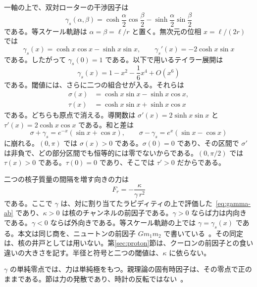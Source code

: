 \documentclass[a4paper]{article}
\begin{document}
一軸の上で、双対ローターの干渉因子は
\begin{equation}
\label{eq:gamma-ab}
\gamma_s(\alpha,\beta)
  =\cosh\frac{\alpha}{2}\cos\frac{\beta}{2}
  -\sinh\frac{\alpha}{2}\sin\frac{\beta}{2}
\end{equation}
である。等スケール軌跡は \(\alpha=\beta=\ell/r\) と置く。無次元の位相 \(x=\ell/(2r)\) では
\begin{equation}
\label{eq:gamma}
\gamma_s(x)=\cosh x\cos x-\sinh x\sin x,
\qquad
\gamma_s'(x)=-2\cosh x\sin x
\end{equation}
である。したがって \(\gamma_s(0)=1\) である。以下で用いるテイラー展開は
\begin{equation}
\label{eq:series}
\gamma_s(x)=1-x^{2}-\frac16 x^{4}+O(x^{6})
\end{equation}
である。閾値には、さらに二つの組合せが入る。それらは
\begin{align}
\label{eq:sigma}
\sigma(x)&=\cosh x\sin x-\sinh x\cos x,\\
\label{eq:tau}
\tau(x)&=\cosh x\sin x+\sinh x\cos x
\end{align}
である。どちらも原点で消える。導関数は \(\sigma'(x)=2\sinh x\sin x\) と \(\tau'(x)=2\cosh x\cos x\) である。和と差は
\begin{equation}
\label{eq:sumdiff}
\sigma+\gamma_s=e^{-x}(\sin x+\cos x),
\qquad
\sigma-\gamma_s=e^{x}(\sin x-\cos x)
\end{equation}
に崩れる。\((0,\pi)\) では \(\sigma(x)>0\) である。\(\sigma(0)=0\) であり、その区間で \(\sigma'\) は非負で、どの部分区間でも恒等的には零でないからである。\((0,\pi/2)\) では \(\tau(x)>0\) である。\(\tau(0)=0\) であり、そこでは \(\tau'>0\) だからである。

二つの核子質量の間隔を増す向きの力は
\begin{equation}
\label{eq:force}
F_r=-\frac{\kappa}{\gamma\,r^{2}}
\end{equation}
である。ここで \(\gamma\) は、対に割り当てたラピディティの上で評価した~\eqref{eq:gamma-ab} であり、\(\kappa>0\) は核のチャンネルの前因子である。\(\gamma>0\) ならば力は内向きである。\(\gamma<0\) ならば外向きである。等スケール軌跡の上では \(\gamma=\gamma_s(x)\) である。本文は同じ商を、ニュートンの前因子 \(G m_1 m_2\) で書いている~\cite{dst-main}。その同定は、核の井戸としては用いない。第\ref{sec:proton}節は、クーロンの前因子との食い違いの大きさを記す。半径と符号と二つの閾値は、\(\kappa\) に依らない。

\(\gamma\) の単純零点では、力は単純極をもつ。親理論の固有時因子は、その零点で正のままである。節は力の発散であり、時計の反転ではない~\cite{dst-main}。
\end{document}
